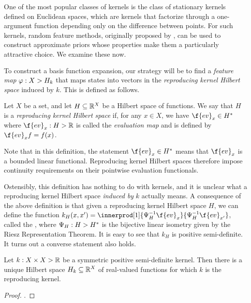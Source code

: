 \documentclass[11pt]{book}
\begin{document}
One of the most popular classes of kernels is the class of stationary kernels defined on Euclidean spaces, which are kernels that factorize through a one-argument function depending only on the difference between points.
For such kernels, random feature methods, originally proposed by \textcite{rahimi08}, can be used to construct approximate priors whose properties make them a particularly attractive choice.
We examine these now.

To construct a basis function expansion, our strategy will be to find a \emph{feature map} $\varphi : X \-> H_k$ that maps states into vectors in the \emph{reproducing kernel Hilbert space} induced by $k$.
This is defined as follows.

\label{ntn:rkhs}
\begin{definition}
Let $X$ be a set, and let $H \subseteq \mathbb{R}^X$ be a Hilbert space of functions. 
We say that $H$ is a \emph{reproducing kernel Hilbert space} if, for any $x\in X$, we have $\f{ev}_x \in H^*$ where $\f{ev}_x : H \-> \R$ is called the \emph{evaluation map} and is defined by $\f{ev}_x f = f(x)$.
\end{definition}

Note that in this definition, the statement $\f{ev}_x \in H^*$ means that $\f{ev}_x$ is a bounded linear functional.
Reproducing kernel Hilbert spaces therefore impose continuity requirements on their pointwise evaluation functionals.

Ostensibly, this definition has nothing to do with kernels, and it is unclear what a reproducing kernel Hilbert space \emph{induced by} $k$ actually means.
A consequence of the above definition is that given a reproducing kernel Hilbert space $H$, we can define the function $k_{H}(x,x') = \innerprod[1]{\Psi_{H}^{-1}\f{ev}_x}{\Psi^{-1}_{H}\f{ev}_{x'}}$, called the , where $\Psi_{H} : H \-> H^*$ is the bijective linear isometry given by the Riesz Representation Theorem.
It is easy to see that $k_{H}$ is positive semi-definite.
It turns out a converse statement also holds.

\begin{result}
Let $k : X \times X \-> \mathbb{R}$ be a symmetric positive semi-definite kernel.
Then there is a unique Hilbert space $H_k \subseteq \mathbb{R}^X$ of real-valued functions for which $k$ is the reproducing kernel.
\end{result}

\begin{proof}
\textcite[Proposition 2.13 and Theorem 2.14]{paulsen16}.
\end{proof}
\end{document}
